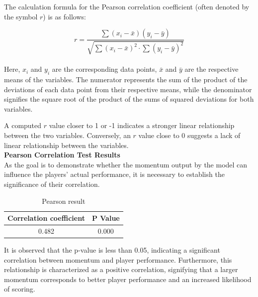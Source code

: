 \documentclass[12pt]{article}
\begin{document}
The calculation formula for the Pearson correlation coefficient (often denoted by the symbol \(r\)) is as follows:

\[ r = \frac{\sum{(x_i - \bar{x})(y_i - \bar{y})}}{\sqrt{\sum{(x_i - \bar{x})^2} \cdot \sum{(y_i - \bar{y})^2}}} \]
\\
Here, \( x_i \) and \( y_i \) are the corresponding data points, \( \bar{x} \) and \( \bar{y} \) are the respective means of the variables. The numerator represents the sum of the product of the deviations of each data point from their respective means, while the denominator signifies the square root of the product of the sums of squared deviations for both variables.

A computed \( r \) value closer to 1 or -1 indicates a stronger linear relationship between the two variables. Conversely, an \( r \) value close to 0 suggests a lack of linear relationship between the variables.
\\
\textbf{Pearson Correlation Test Results}\\

As the goal is to demonstrate whether the momentum output by the model can influence the players' actual performance, it is necessary to establish the significance of their correlation.
\begin{table}[H]
      \centering
      \begin{tabular}{|c|c|}
      \hline
      \textbf{Correlation coefficient} & \textbf{P Value} \\ \hline
      0.482 &  0.000\\ \hline
      \end{tabular}
      \caption{Pearson result}
\end{table}
It is observed that the p-value is less than 0.05, indicating a significant correlation between momentum and player performance. Furthermore, this relationship is characterized as a positive correlation, signifying that a larger momentum corresponds to better player performance and an increased likelihood of scoring.
\end{document}
